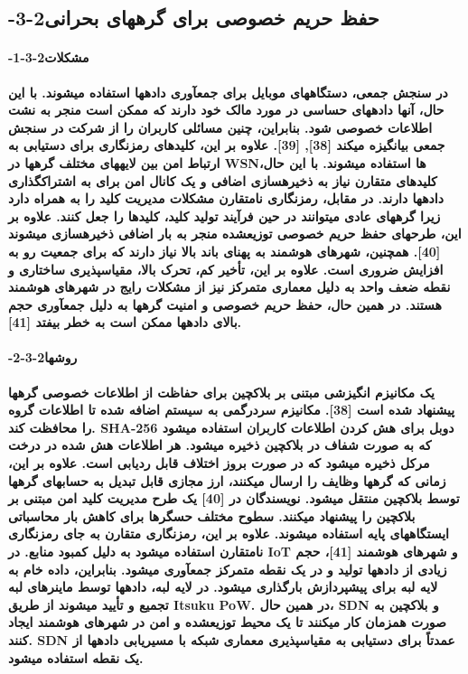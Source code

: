 \documentclass{article} %
\begin{document}
\noindent 
\subsection{ -3-2حفظ حریم خصوصی برای گرههای بحرانی}

\noindent 
\paragraph{ -1-3-2مشکلات}

\noindent 
{\bf  در سنجش جمعی، دستگاههای موبایل برای جمعآوری دادهها استفاده میشوند. با این حال، آنها دادههای حساسی در مورد مالک خود دارند که ممکن است منجر به نشت اطلاعات خصوصی شود. بنابراین، چنین مسائلی کاربران را از شرکت در سنجش جمعی بیانگیزه میکند [38], [39]. علاوه بر این، کلیدهای رمزنگاری برای دستیابی به ارتباط امن بین لایههای مختلف گرهها در WSNها استفاده میشوند. با این حال، کلیدهای متقارن نیاز به ذخیرهسازی اضافی و یک کانال امن برای به اشتراکگذاری دادهها دارند. در مقابل، رمزنگاری نامتقارن مشکلات مدیریت کلید را به همراه دارد زیرا گرههای عادی میتوانند در حین فرآیند تولید کلید، کلیدها را جعل کنند. علاوه بر این، طرحهای حفظ حریم خصوصی توزیعشده منجر به بار اضافی ذخیرهسازی میشوند [40]. همچنین، شهرهای هوشمند به پهنای باند بالا نیاز دارند که برای جمعیت رو به افزایش ضروری است. علاوه بر این، تأخیر کم، تحرک بالا، مقیاسپذیری ساختاری و نقطه ضعف واحد به دلیل معماری متمرکز نیز از مشکلات رایج در شهرهای هوشمند هستند. در همین حال، حفظ حریم خصوصی و امنیت گرهها به دلیل جمعآوری حجم بالای دادهها ممکن است به خطر بیفتد [41].}

\noindent 
\paragraph{ -2-3-2روشها}

\noindent 
{\bf یک مکانیزم انگیزشی مبتنی بر بلاکچین برای حفاظت از اطلاعات خصوصی گرهها پیشنهاد شده است [38]. مکانیزم سردرگمی به سیستم اضافه شده تا اطلاعات گروه را محافظت کند. SHA-256 دوبل برای هش کردن اطلاعات کاربران استفاده میشود که به صورت شفاف در بلاکچین ذخیره میشود. هر اطلاعات هش شده در درخت مرکل ذخیره میشود که در صورت بروز اختلاف قابل ردیابی است. علاوه بر این، زمانی که گرهها وظایف را ارسال میکنند، ارز مجازی قابل تبدیل به حسابهای گرهها توسط بلاکچین منتقل میشود. نویسندگان در [40] یک طرح مدیریت کلید امن مبتنی بر بلاکچین را پیشنهاد میکنند. سطوح مختلف حسگرها برای کاهش بار محاسباتی ایستگاههای پایه استفاده میشوند. علاوه بر این، رمزنگاری متقارن به جای رمزنگاری نامتقارن استفاده میشود به دلیل کمبود منابع. در IoT و شهرهای هوشمند [41]، حجم زیادی از دادهها تولید و در یک نقطه متمرکز جمعآوری میشود. بنابراین، داده خام به لایه لبه برای پیشپردازش بارگذاری میشود. در لایه لبه، دادهها توسط ماینرهای لبه تجمیع و تأیید میشوند از طریق Itsuku PoW. در همین حال، SDN و بلاکچین به صورت همزمان کار میکنند تا یک محیط توزیعشده و امن در شهرهای هوشمند ایجاد کنند. SDN عمدتاً برای دستیابی به مقیاسپذیری معماری شبکه با مسیریابی دادهها از یک نقطه استفاده میشود.}
\end{document}
